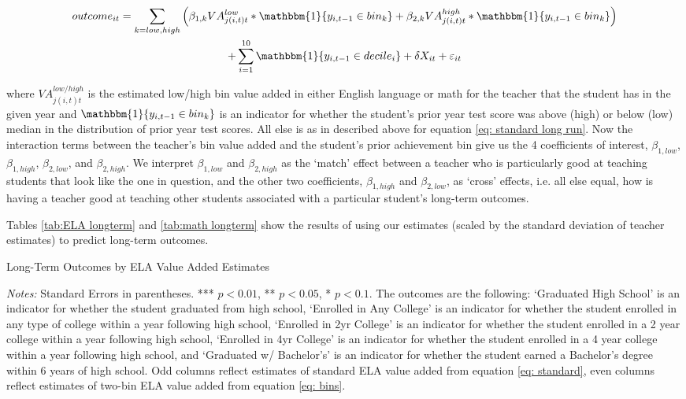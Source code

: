 \documentclass[letterpaper,12pt]{article}
\begin{document}
    \begin{gather}
        outcome_{it} = \sum_{k=low,high}\left(\beta_{1,k} VA^{low}_{j(i,t)t}*\mathbbm{1}\{y_{i,t-1} \in bin_k\} + \beta_{2,k} VA^{high}_{j(i,t)t}*\mathbbm{1}\{y_{i,t-1} \in bin_k\}\right)\nonumber \\ + \sum_{i=1}^{10} \mathbbm{1}\{y_{i,t-1} \in decile_i\} + \delta X_{it} + \varepsilon_{it}\label{eq: two-bin long run}
    \end{gather}
    
\noindent where $VA^{low/high}_{j(i,t)t}$ is the estimated low/high bin value added in either English language or math for the teacher that the student has in the given year and $\mathbbm{1}\{y_{i,t-1} \in bin_k\}$ is an indicator for whether the student's prior year test score was above (high) or below (low) median in the distribution of prior year test scores. All else is as in described above for equation \ref{eq: standard long run}. Now the interaction terms between the teacher's bin value added and the student's prior achievement bin give us the 4 coefficients of interest, $\beta_{1,low}$, $\beta_{1,high}$, $\beta_{2,low}$, and $\beta_{2,high}$. We interpret $\beta_{1,low}$ and $\beta_{2,high}$ as the `match' effect between a teacher who is particularly good at teaching students that look like the one in question, and the other two coefficients, $\beta_{1,high}$ and $\beta_{2,low}$, as `cross' effects, i.e. all else equal, how is having a teacher good at teaching other students associated with a particular student's long-term outcomes.

Tables \ref{tab:ELA longterm} and \ref{tab:math longterm} show the results of using our estimates (scaled by the standard deviation of teacher estimates) to predict long-term outcomes.

\begin{landscape}
    \vspace*{\fill}
    \begin{table}[ht]
        \centering
        \caption{Long-Term Outcomes by ELA Value Added Estimates}
        \resizebox{1.4\textwidth}{!}{}
        \label{tab:ELA longterm}
    \end{table}
    \centering
    \footnotesize{\textit{Notes:} Standard Errors in parentheses. *** $p<0.01$, ** $p<0.05$, * $p<0.1$. The outcomes are the following: `Graduated High School' is an indicator for whether the student graduated from high school, `Enrolled in Any College' is an indicator for whether the student enrolled in any type of college within a year following high school, `Enrolled in 2yr College' is an indicator for whether the student enrolled in a 2 year college within a year following high school, `Enrolled in 4yr College' is an indicator for whether the student enrolled in a 4 year college within a year following high school, and `Graduated w/ Bachelor's' is an indicator for whether the student earned a Bachelor's degree within 6 years of high school. Odd columns reflect estimates of standard ELA value added from equation \ref{eq: standard}, even columns reflect estimates of two-bin ELA value added from equation \ref{eq: bins}.}
    \vspace*{\fill}
\end{landscape}
\end{document}

